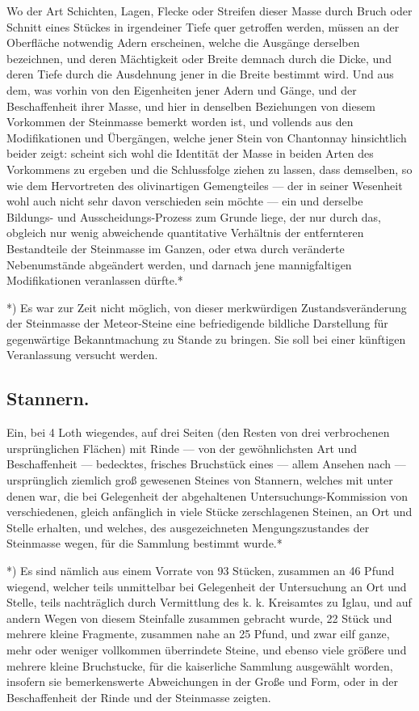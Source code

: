 \documentclass[a4paper, 11pt, oneside, german]{article}
\begin{document}
Wo der Art Schichten, Lagen, Flecke oder Streifen dieser Masse durch Bruch oder Schnitt eines Stückes in irgendeiner Tiefe quer getroffen werden, müssen an der Oberfläche notwendig Adern erscheinen, welche die Ausgänge derselben bezeichnen, und deren Mächtigkeit oder Breite demnach durch die Dicke, und deren Tiefe durch die Ausdehnung jener in die Breite bestimmt wird. Und aus dem, was vorhin von den Eigenheiten jener Adern und Gänge, und der Beschaffenheit ihrer Masse, und hier in denselben Beziehungen von diesem Vorkommen der Steinmasse bemerkt worden ist, und vollends aus den Modifikationen und Übergängen, welche jener Stein von Chantonnay hinsichtlich beider zeigt: scheint sich wohl die Identität der Masse in beiden Arten des Vorkommens zu ergeben und die Schlussfolge ziehen zu lassen, dass demselben, so wie dem Hervortreten des olivinartigen Gemengteiles --- der in seiner Wesenheit wohl auch nicht sehr davon verschieden sein möchte --- ein und derselbe Bildungs- und Ausscheidungs-Prozess zum Grunde liege, der nur durch das, obgleich nur wenig abweichende quantitative Verhältnis der entfernteren Bestandteile der Steinmasse im Ganzen, oder etwa durch veränderte Nebenumstände abgeändert werden, und darnach jene mannigfaltigen Modifikationen veranlassen dürfte.*

*) Es war zur Zeit nicht möglich, von dieser merkwürdigen Zustandsveränderung der Steinmasse der Meteor-Steine eine befriedigende bildliche Darstellung für gegenwärtige Bekanntmachung zu Stande zu bringen. Sie soll bei einer künftigen Veranlassung versucht werden.

\subsection{Stannern.}

Ein, bei 4 Loth wiegendes, auf drei Seiten (den Resten von drei verbrochenen ursprünglichen Flächen) mit Rinde --- von der gewöhnlichsten Art und Beschaffenheit --- bedecktes, frisches Bruchstück eines --- allem Ansehen nach --- ursprünglich ziemlich groß gewesenen Steines von Stannern, welches mit unter denen war, die bei Gelegenheit der abgehaltenen Untersuchungs-Kommission von verschiedenen, gleich anfänglich in viele Stücke zerschlagenen Steinen, an Ort und Stelle erhalten, und welches, des ausgezeichneten Mengungszustandes der Steinmasse wegen, für die Sammlung bestimmt wurde.*

*) Es sind nämlich aus einem Vorrate von 93 Stücken, zusammen an 46 Pfund wiegend, welcher teils unmittelbar bei Gelegenheit der Untersuchung an Ort und Stelle, teils nachträglich durch Vermittlung des k. k. Kreisamtes zu Iglau, und auf andern Wegen von diesem Steinfalle zusammen gebracht wurde, 22 Stück und mehrere kleine Fragmente, zusammen nahe an 25 Pfund, und zwar eilf ganze, mehr oder weniger vollkommen überrindete Steine, und ebenso viele größere und mehrere kleine Bruchstucke, für die kaiserliche Sammlung ausgewählt worden, insofern sie bemerkenswerte Abweichungen in der Große und Form, oder in der Beschaffenheit der Rinde und der Steinmasse zeigten.
\end{document}
